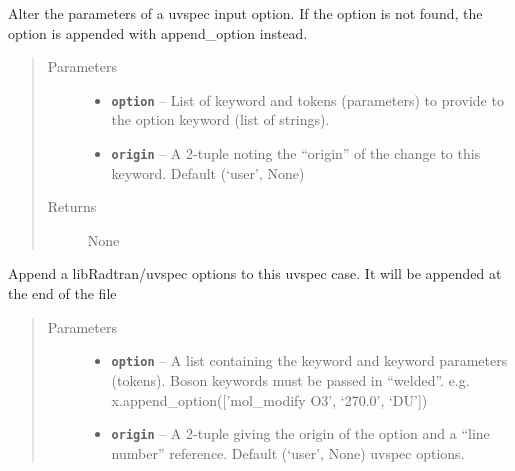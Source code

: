 \documentclass[a4paper,10pt,english]{sphinxmanual}
\begin{document}
\begin{fulllineitems}
\begin{fulllineitems}
\end{fulllineitems}


\begin{fulllineitems}
\label{packages:librad.Case.alter_option}
Alter the parameters of a uvspec input option. If the option is not found, the option is appended with
append\_option instead.
\begin{quote}\begin{description}
\item[{Parameters}] \leavevmode\begin{itemize}
\item {} 
\textbf{\texttt{option}} -- List of keyword and tokens (parameters) to provide to the option keyword (list of strings).

\item {} 
\textbf{\texttt{origin}} -- A 2-tuple noting the ``origin'' of the change to this keyword. Default (`user', None)

\end{itemize}

\item[{Returns}] \leavevmode
None

\end{description}\end{quote}

\end{fulllineitems}


\begin{fulllineitems}
\label{packages:librad.Case.append_option}
Append a libRadtran/uvspec options to this uvspec case. It will be appended at the end of the file
\begin{quote}\begin{description}
\item[{Parameters}] \leavevmode\begin{itemize}
\item {} 
\textbf{\texttt{option}} -- A list containing the keyword and keyword parameters (tokens). Boson keywords must be passed
in ``welded''. e.g. x.append\_option({[}'mol\_modify O3', `270.0',  `DU'{]})

\item {} 
\textbf{\texttt{origin}} -- A 2-tuple giving the origin of the option and a ``line number'' reference. Default (`user', None)
uvspec options.


\end{itemize}
\end{description}
\end{quote}
\end{fulllineitems}
\end{fulllineitems}
\end{document}
